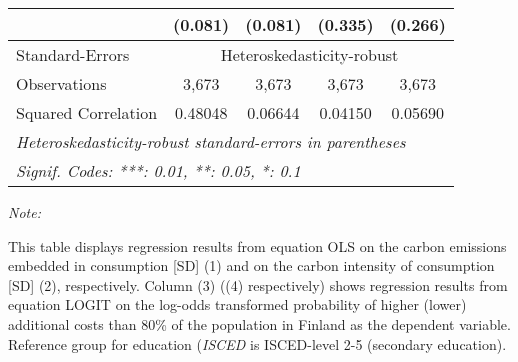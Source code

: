 \begin{table}[htbp!]
\begin{adjustbox}{width = 1\textwidth, max height = 0.95\textheight, center}
\begin{threeparttable}[b]
\begin{tabular}{lcccc}
                                 & (0.081)            & (0.081)            & (0.335)        & (0.266)\\   
            \midrule 
            Standard-Errors & \multicolumn{4}{c}{Heteroskedasticity-robust} \\ 
            Observations         & 3,673              & 3,673              & 3,673          & 3,673\\  
            Squared Correlation  & 0.48048            & 0.06644            & 0.04150        & 0.05690\\  
            \midrule \midrule
            \multicolumn{5}{l}{\emph{Heteroskedasticity-robust standard-errors in parentheses}}\\
            \multicolumn{5}{l}{\emph{Signif. Codes: ***: 0.01, **: 0.05, *: 0.1}}\\
         \end{tabular}
         
         \begin{tablenotes}\item \medskip \textit{Note:}
            \item This table displays regression results from equation OLS on the carbon emissions embedded in consumption [SD] (1) and on the carbon intensity of consumption [SD] (2), respectively. 
                                      Column (3) ((4) respectively) shows regression results from equation LOGIT on the log-odds transformed probability of higher (lower) additional costs than 80\% of the population in Finland as the dependent variable. Reference group for education (\textit{ISCED} is ISCED-level 2-5 (secondary education).
         \end{tablenotes}
      \end{threeparttable}
   \end{adjustbox}
\end{table}


